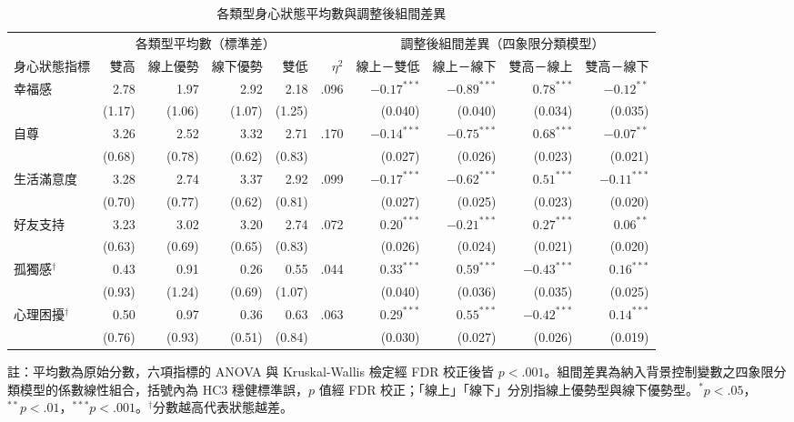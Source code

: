 \begin{table}[htbp]
\centering
\caption{各類型身心狀態平均數與調整後組間差異}
\label{tab:main}
\footnotesize
\setlength{\tabcolsep}{4pt}
\renewcommand{\arraystretch}{1.12}
\begin{tabular}{l rrrr r rrrr}
\toprule
& \multicolumn{4}{c}{各類型平均數（標準差）} & & \multicolumn{4}{c}{調整後組間差異（四象限分類模型）} \\
\cmidrule(lr){2-5} \cmidrule(lr){7-10}
身心狀態指標 & 雙高 & 線上優勢 & 線下優勢 & 雙低 & $\eta^2$ & 線上－雙低 & 線上－線下 & 雙高－線上 & 雙高－線下 \\
\midrule
幸福感 & 2.78 & 1.97 & 2.92 & 2.18 & .096 & $-0.17^{***}$ & $-0.89^{***}$ & $0.78^{***}$ & $-0.12^{**}$ \\
 & (1.17) & (1.06) & (1.07) & (1.25) & & (0.040) & (0.040) & (0.034) & (0.035) \\[2pt]
自尊 & 3.26 & 2.52 & 3.32 & 2.71 & .170 & $-0.14^{***}$ & $-0.75^{***}$ & $0.68^{***}$ & $-0.07^{**}$ \\
 & (0.68) & (0.78) & (0.62) & (0.83) & & (0.027) & (0.026) & (0.023) & (0.021) \\[2pt]
生活滿意度 & 3.28 & 2.74 & 3.37 & 2.92 & .099 & $-0.17^{***}$ & $-0.62^{***}$ & $0.51^{***}$ & $-0.11^{***}$ \\
 & (0.70) & (0.77) & (0.62) & (0.81) & & (0.027) & (0.025) & (0.023) & (0.020) \\[2pt]
好友支持 & 3.23 & 3.02 & 3.20 & 2.74 & .072 & $0.20^{***}$ & $-0.21^{***}$ & $0.27^{***}$ & $0.06^{**}$ \\
 & (0.63) & (0.69) & (0.65) & (0.83) & & (0.026) & (0.024) & (0.021) & (0.020) \\[2pt]
孤獨感$^{\dagger}$ & 0.43 & 0.91 & 0.26 & 0.55 & .044 & $0.33^{***}$ & $0.59^{***}$ & $-0.43^{***}$ & $0.16^{***}$ \\
 & (0.93) & (1.24) & (0.69) & (1.07) & & (0.040) & (0.036) & (0.035) & (0.025) \\[2pt]
心理困擾$^{\dagger}$ & 0.50 & 0.97 & 0.36 & 0.63 & .063 & $0.29^{***}$ & $0.55^{***}$ & $-0.42^{***}$ & $0.14^{***}$ \\
 & (0.76) & (0.93) & (0.51) & (0.84) & & (0.030) & (0.027) & (0.026) & (0.019) \\[2pt]
\bottomrule
\end{tabular}

\vspace{0.4em}
\parbox{\linewidth}{\scriptsize 註：平均數為原始分數，六項指標的 ANOVA 與 Kruskal-Wallis 檢定經 FDR 校正後皆 $p<.001$。組間差異為納入背景控制變數之四象限分類模型的係數線性組合，括號內為 HC3 穩健標準誤，$p$ 值經 FDR 校正；「線上」「線下」分別指線上優勢型與線下優勢型。$^{*}p<.05$，$^{**}p<.01$，$^{***}p<.001$。$^{\dagger}$分數越高代表狀態越差。}
\end{table}
